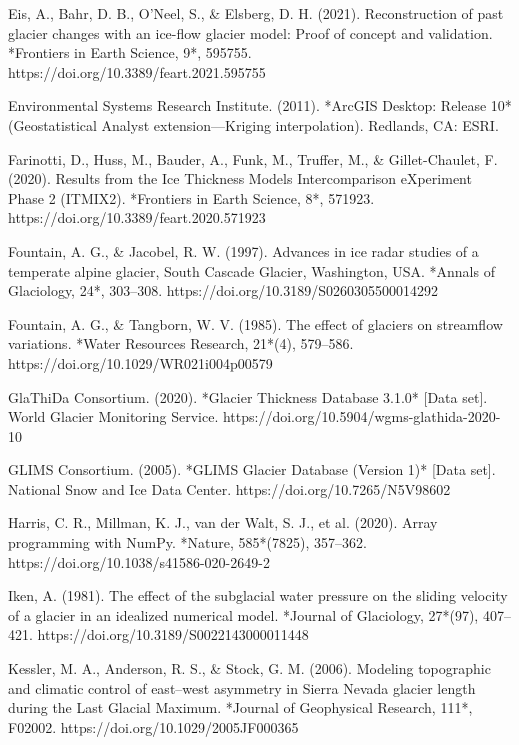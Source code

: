 \documentclass{article}
\begin{document}
\begin{thebibliography}{}
    Eis, A., Bahr, D. B., O’Neel, S., \& Elsberg, D. H. (2021). Reconstruction of past glacier changes with an ice-flow glacier model: Proof of concept and validation. *Frontiers in Earth Science, 9*, 595755. https://doi.org/10.3389/feart.2021.595755

    Environmental Systems Research Institute. (2011). *ArcGIS Desktop: Release 10* (Geostatistical Analyst extension—Kriging interpolation). Redlands, CA: ESRI.

    Farinotti, D., Huss, M., Bauder, A., Funk, M., Truffer, M., \& Gillet-Chaulet, F. (2020). Results from the Ice Thickness Models Intercomparison eXperiment Phase 2 (ITMIX2). *Frontiers in Earth Science, 8*, 571923. https://doi.org/10.3389/feart.2020.571923

    Fountain, A. G., \& Jacobel, R. W. (1997). Advances in ice radar studies of a temperate alpine glacier, South Cascade Glacier, Washington, USA. *Annals of Glaciology, 24*, 303–308. https://doi.org/10.3189/S0260305500014292

    Fountain, A. G., \& Tangborn, W. V. (1985). The effect of glaciers on streamflow variations. *Water Resources Research, 21*(4), 579–586. https://doi.org/10.1029/WR021i004p00579

    GlaThiDa Consortium. (2020). *Glacier Thickness Database 3.1.0* [Data set]. World Glacier Monitoring Service. https://doi.org/10.5904/wgms-glathida-2020-10

    GLIMS Consortium. (2005). *GLIMS Glacier Database (Version 1)* [Data set]. National Snow and Ice Data Center. https://doi.org/10.7265/N5V98602

    Harris, C. R., Millman, K. J., van der Walt, S. J., et al. (2020). Array programming with NumPy. *Nature, 585*(7825), 357–362. https://doi.org/10.1038/s41586-020-2649-2

    Iken, A. (1981). The effect of the subglacial water pressure on the sliding velocity of a glacier in an idealized numerical model. *Journal of Glaciology, 27*(97), 407–421. https://doi.org/10.3189/S0022143000011448

    Kessler, M. A., Anderson, R. S., \& Stock, G. M. (2006). Modeling topographic and climatic control of east–west asymmetry in Sierra Nevada glacier length during the Last Glacial Maximum. *Journal of Geophysical Research, 111*, F02002. https://doi.org/10.1029/2005JF000365


\end{thebibliography}
\end{document}
